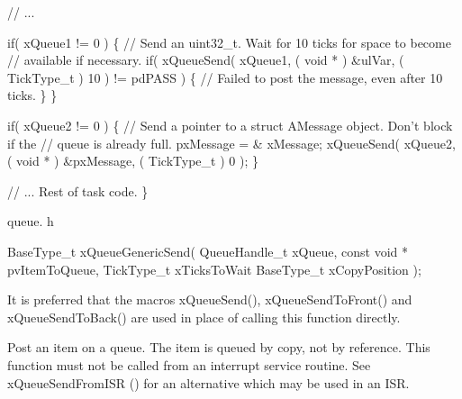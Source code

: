 \begin{DoxyPre}   // ...\end{DoxyPre}



\begin{DoxyPre}   if( xQueue1 != 0 )
   \{
    // Send an uint32\_t.  Wait for 10 ticks for space to become
    // available if necessary.
    if( xQueueSend( xQueue1, ( void * ) \&ulVar, ( TickType\_t ) 10 ) != pdPASS )
    \{
        // Failed to post the message, even after 10 ticks.
    \}
   \}\end{DoxyPre}



\begin{DoxyPre}   if( xQueue2 != 0 )
   \{
    // Send a pointer to a struct AMessage object.  Don't block if the
    // queue is already full.
    pxMessage = \& xMessage;
    xQueueSend( xQueue2, ( void * ) \&pxMessage, ( TickType\_t ) 0 );
   \}\end{DoxyPre}



\begin{DoxyPre}   // ... Rest of task code.
\}
\end{DoxyPre}


queue. h 
\begin{DoxyPre}
BaseType\_t xQueueGenericSend(
                                QueueHandle\_t xQueue,
                                const void * pvItemToQueue,
                                TickType\_t xTicksToWait
                                BaseType\_t xCopyPosition
                            );
  \end{DoxyPre}


It is preferred that the macros x\+Queue\+Send(), x\+Queue\+Send\+To\+Front() and x\+Queue\+Send\+To\+Back() are used in place of calling this function directly.

Post an item on a queue. The item is queued by copy, not by reference. This function must not be called from an interrupt service routine. See x\+Queue\+Send\+From\+I\+S\+R () for an alternative which may be used in an I\+S\+R.


